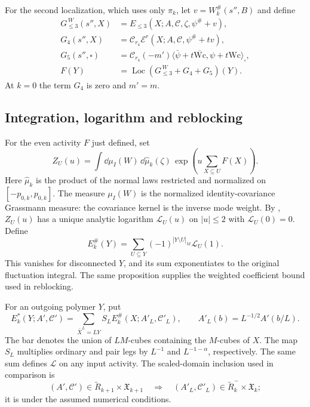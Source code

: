 For the second localization, which uses only $\pi_k$, let
$v=W_k^\#(s'',B)$ and define
\begin{align}
 G_{\le3}^{\,W}(s'',X)&=E_{\le3}(X;A,\mathscr C,\zeta,
                                                      \psi^\#+v),
                                      \label{eq:rgnl-GW}\\
 G_4(s'',X)&=\mathcal C_{r_4}
                  \mathscr E^r(X;A,\mathscr C,\psi^\#+tv),\\
 G_5(s'',\square)&=\mathcal C_{r_4}(-m')
                 \langle\bar\psi+t\overline{\mathrm{Wc}},
                                   \psi+t\mathrm{Wc}\rangle_\square,\\
 F(Y)&=\operatorname{Loc}(G_{\le3}^{\,W}+G_4+G_5)(Y).
                                      \label{eq:rgnl-finite-activity}
\end{align}
At $k=0$ the term $G_4$ is zero and $m'=m$.


\subsection{Integration, logarithm and reblocking}
For the even activity $F$ just defined, set
\[
 Z_U(u)=\int\dd\mu_I(W)\,\dd\widehat\mu_k(\zeta)\,
                   \exp\left(u\sum_{X\subseteq U}F(X)\right).
\]
Here $\widehat\mu_k$ is the product of the normal laws restricted
and normalized on $[-p_{0,k},p_{0,k}]$. The measure $\mu_I(W)$ is
the normalized identity-covariance Grassmann measure: the covariance
kernel is the inverse mode weight. By
\cite[Proposition~6.1]{NonlinearStep}, $Z_U(u)$ has a unique analytic
logarithm $\mathcal L_U(u)$ on $|u|\le2$ with $\mathcal L_U(0)=0$.
Define
\[
 E_k^\#(Y)=\sum_{U\subseteq Y}(-1)^{|Y\setminus U|_M}\mathcal L_U(1).
\]
This vanishes for disconnected $Y$, and its sum exponentiates to
the original fluctuation integral. The same proposition supplies
the weighted coefficient bound used in reblocking.

For an outgoing polymer $Y$, put
\[
 E_k^*(Y;A',\mathscr C')=\sum_{\bar X^L=LY}
              S_LE_k^\#(X;A'_L,\mathscr C'_L),\qquad
 A'_L(b)=L^{-1/2}A'(b/L).
\]
The bar denotes the union of $LM$-cubes containing the $M$-cubes of $X$.
The map $S_L$ multiplies ordinary and pair legs by $L^{-1}$ and
$L^{-1-\alpha}$, respectively. The same sum defines $\mathcal L$
on any input activity. The scaled-domain inclusion used in comparison is
\begin{equation}\label{eq:rg-scaled-domain-inclusion}
 (A',\mathscr C')\in\widetilde R_{k+1}\times\mathfrak X_{k+1}
 \quad\Longrightarrow\quad
 (A'_L,\mathscr C'_L)\in\widetilde R_k^-\times\mathfrak X_k;
\end{equation}
it is \cite[(29)]{NormalizedContraction} under the assumed numerical conditions.
\printbibliography

